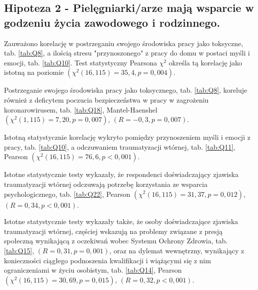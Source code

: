 \documentclass[a4paper,12pt,twoside,openright]{mwrep}
\begin{document}


 

\subsection*{Hipoteza 2 - Pielęgniarki/arze mają wsparcie w godzeniu życia zawodowego i rodzinnego.}



Zauważono korelację w postrzeganiu swojego środowiska pracy jako toksyczne, tab. \ref{tab:Q8}, a ilością stresu "przynoszonego" z pracy do domu w postaci myśli i emocji, tab. \ref{tab:Q10}. Test statystyczny Pearsona $\chi^2$ określa tą korelację jako istotną na poziomie $(\chi^2 (16, 115) = 35,4, p = 0,004)$.

Postrzeganie swojego środowiska pracy jako toksycznego, tab. \ref{tab:Q8}, koreluje również z deficytem poczucia bezpieczeństwa w pracy w zagrożeniu koronarowirusem, tab. \ref{tab:Q18}, Mantel-Haenshel $(\chi^2 (1, 115) = 7,20, p=0,007)$, $(R = -0,3, p = 0,007)$. 

Istotną statystycznie korelację wykryto pomiędzy przynoszeniem myśli i emocji z pracy, tab. \ref{tab:Q10}, a odczuwaniem traumatyzacji wtórnej, tab. \ref{tab:Q11}, Pearson $(\chi^2 (16, 115) = 76,6, p < 0,001)$.
  
Istotne statystycznie testy wykazały, że respondenci doświadczający zjawiska traumatyzacji wtórnej odczuwają potrzebę korzystania ze wsparcia psychologicznego, tab. \ref{tab:Q22}, Pearson $(\chi^2 (16, 115) = 31,37, p = 0,012)$,  $(R = 0,34, p < 0,001)$.

Istotne statystycznie testy wykazały także, że osoby doświadczające zjawiska traumatyzacji wtórnej, częściej wskazują na problemy związane z presją społeczną wynikającą z oczekiwań wobec Systemu Ochrony Zdrowia, tab. \ref{tab:Q15}, $(R = 0,31, p = 0,001)$, oraz na dylemat wewnętrzny, wynikający z konieczności ciągłego podnoszenia kwalifikacji i wiążącymi się z nim ograniczeniami w życiu osobistym, tab. \ref{tab:Q14}, Pearson $(\chi^2 (16, 115) = 30,69, p = 0,015)$,  $(R = 0,32, p < 0,001)$.
\end{document}
